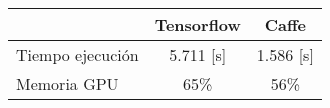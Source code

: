 \begin{table}[]
\begin{tabular}{lcc}
\toprule
                 & Tensorflow    & Caffe         \\
                 \midrule
Tiempo ejecución & 5.711 {[}s{]} & 1.586 {[}s{]} \\
Memoria GPU      & 65\%          & 56\%   \\
\bottomrule
\end{tabular}
\end{table}